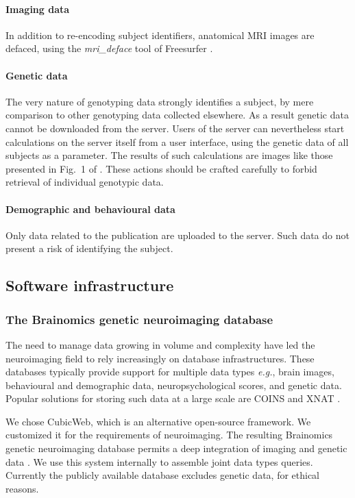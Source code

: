 \documentclass[review]{elsarticle}
\begin{document}
\paragraph{Imaging data} In addition to re-encoding subject identifiers, anatomical MRI images are defaced, using the \textit{mri\_deface} tool of Freesurfer \cite{Fischl2012}.

\paragraph{Genetic data} The very nature of genotyping data strongly identifies a subject, by mere comparison to other genotyping data collected elsewhere. As a result genetic data cannot be downloaded from the server. Users of the server can nevertheless start calculations on the server itself from a user interface, using the genetic data of all subjects as a parameter. The results of such calculations are images like those presented in Fig.~1 of \cite{Pinel2012}. These actions should be crafted carefully to forbid retrieval of individual genotypic data.

\paragraph{Demographic and behavioural data} Only data related to the publication \cite{Pinel2007} are uploaded to the server. Such data do not present a risk of identifying the subject.


\subsection{Software infrastructure}

\subsubsection{The Brainomics genetic neuroimaging database}

The need to manage data growing in volume and complexity have led the neuroimaging field to rely increasingly on database infrastructures. These databases typically provide support for multiple data types \textit{e.g.}, brain images, behavioural and demographic data, neuropsychological scores, and genetic data. Popular solutions for storing such data at a large scale are COINS \cite{COINS2011} and XNAT \cite{XNAT2007}.

We chose CubicWeb, which is an alternative open-source framework. We customized it for the requirements of neuroimaging. The resulting Brainomics genetic neuroimaging database permits a deep integration of imaging and genetic data \cite{HBM2013}. We use this system internally to assemble joint data types queries. Currently the publicly available database excludes genetic data, for ethical reasons.
\end{document}
